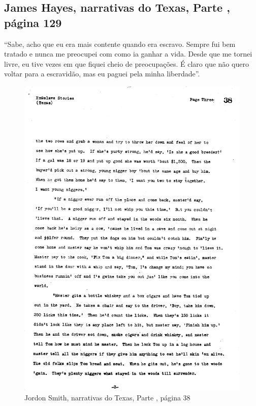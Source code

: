 \subsection{James Hayes, narrativas do Texas, Parte , página 129} \label{ref129}

``Sabe, acho que eu era mais contente quando era escravo. Sempre fui bem
tratado e nunca me preocupei com como ia ganhar a vida. Desde que me
tornei livre, eu tive vezes em que fiquei cheio de preocupações. É claro
que não quero voltar para a escravidão, mas eu paguei pela minha
liberdade''.

\pagebreak
\thispagestyle{empty}
\movetoevenpage
\thispagestyle{empty}
\begin{absolutelynopagebreak}
\begin{vplace}
\begin{figure}[H]
\begin{adjustwidth}{-1.6cm}{}
  \vspace*{-2cm}
  \includegraphics[width=130mm]{./imgs/Cap3.jpg}  
\end{adjustwidth}
  \caption{Jordon Smith, narrativas do Texas, Parte , página 38}
\end{figure}
\end{vplace}

\end{absolutelynopagebreak}

